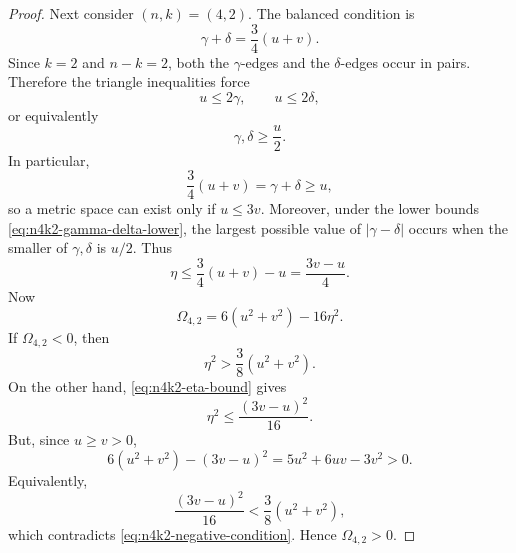 \documentclass[11pt]{amsart}
\numberwithin{equation}{section}
\theoremstyle{definition}
\theoremstyle{remark}
\begin{document}
\begin{proof}
Next consider \((n,k)=(4,2)\).  The balanced condition is
\begin{equation}\label{eq:n4k2-balanced-sum}
\gamma+\delta=\frac{3}{4}(u+v).
\end{equation}
Since \(k=2\) and \(n-k=2\), both the \(\gamma\)-edges and the
\(\delta\)-edges occur in pairs.  Therefore the triangle inequalities force
\begin{equation}\label{eq:n4k2-lower-bounds}
u\leq 2\gamma,
\qquad
u\leq 2\delta,
\end{equation}
or equivalently
\begin{equation}\label{eq:n4k2-gamma-delta-lower}
\gamma,\delta\geq \frac{u}{2}.
\end{equation}
In particular,
\begin{equation}\label{eq:n4k2-necessary}
\frac{3}{4}(u+v)=\gamma+\delta\geq u,
\end{equation}
so a metric space can exist only if \(u\leq 3v\).  Moreover, under the lower
bounds \eqref{eq:n4k2-gamma-delta-lower}, the largest possible value of
\(|\gamma-\delta|\) occurs when the smaller of \(\gamma,\delta\) is \(u/2\).
Thus
\begin{equation}\label{eq:n4k2-eta-bound}
\eta
\leq
\frac{3}{4}(u+v)-u
=
\frac{3v-u}{4}.
\end{equation}
Now
\begin{equation}\label{eq:n4k2-Omega}
\Omega_{4,2}=6(u^2+v^2)-16\eta^2.
\end{equation}
If \(\Omega_{4,2}<0\), then
\begin{equation}\label{eq:n4k2-negative-condition}
\eta^2>\frac{3}{8}(u^2+v^2).
\end{equation}
On the other hand, \eqref{eq:n4k2-eta-bound} gives
\begin{equation}\label{eq:n4k2-upper-square}
\eta^2\leq \frac{(3v-u)^2}{16}.
\end{equation}
But, since \(u\geq v>0\),
\begin{equation}\label{eq:n4k2-elementary-positive}
6(u^2+v^2)-(3v-u)^2
=
5u^2+6uv-3v^2
>0.
\end{equation}
Equivalently,
\begin{equation}\label{eq:n4k2-contradiction}
\frac{(3v-u)^2}{16}
<
\frac{3}{8}(u^2+v^2),
\end{equation}
which contradicts \eqref{eq:n4k2-negative-condition}.  Hence
\(\Omega_{4,2}>0\).


\end{proof}
\end{document}
